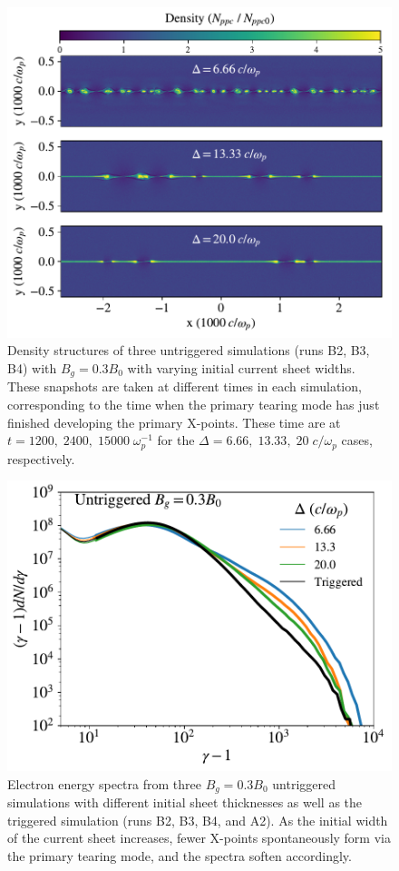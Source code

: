\begin{figure}[htp] 
	\includegraphics[width=\linewidth]{thickness_flds.pdf}
	\caption{Density structures of three untriggered simulations (runs B2, B3, B4) with $B_{g}=0.3{B_{0}}$ with varying initial current sheet widths.  These snapshots are taken at different times in each simulation, corresponding to the time when the primary tearing mode has just finished developing the primary X-points.  These time are at $t=1200, \; 2400, \; 15000 \; \omega_{p}^{-1}$ for the $\Delta=6.66, \;13.33, \;20 \; c/\omega_{p}$ cases, respectively.}
	\label{untriggered_thickness_flds}
\end{figure}

\begin{figure}[htp] 
	\includegraphics[width=\linewidth]{untrig_thickness_spec.pdf}
	\caption{Electron energy spectra from three $B_{g}=0.3B_{0}$ untriggered simulations with different initial sheet thicknesses as well as the triggered simulation (runs B2, B3, B4, and A2).  As the initial width of the current sheet increases, fewer X-points spontaneously form via the primary tearing mode, and the spectra soften accordingly.}
	\label{untriggered_thickness_spec}
\end{figure}

